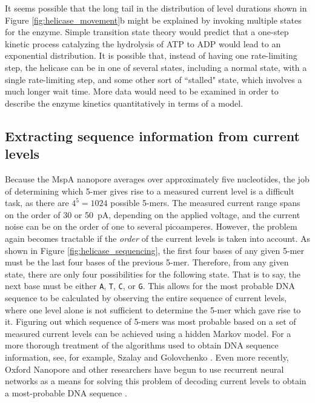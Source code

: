 It seems possible that the long tail in the distribution of level durations shown in Figure \ref{fig:helicase_movement}b might be explained by invoking multiple states for the enzyme.  Simple transition state theory would predict that a one-step kinetic process catalyzing the hydrolysis of ATP to ADP would lead to an exponential distribution.  It is possible that, instead of having one rate-limiting step, the helicase can be in one of several states, including a normal state, with a single rate-limiting step, and some other sort of ``stalled" state, which involves a much longer wait time.  More data would need to be examined in order to describe the enzyme kinetics quantitatively in terms of a model.

\subsection{Extracting sequence information from current levels}

Because the MspA nanopore averages over approximately five nucleotides, the job of determining which 5-mer gives rise to a measured current level is a difficult task, as there are $4^5 = 1024$ possible 5-mers.  The measured current range spans on the order of \num{30} or \SI{50}{\pA}, depending on the applied voltage, and the current noise can be on the order of one to several picoamperes.  However, the problem again becomes tractable if the \textit{order} of the current levels is taken into account.  As shown in Figure \ref{fig:helicase_sequencing}, the first four bases of any given 5-mer must be the last four bases of the previous 5-mer.  Therefore, from any given state, there are only four possibilities for the following state.  That is to say, the next base must be either \texttt{A}, \texttt{T}, \texttt{C}, or \texttt{G}.  This allows for the most probable DNA sequence to be calculated by observing the entire sequence of current levels, where one level alone is not sufficient to determine the 5-mer which gave rise to it.  Figuring out which sequence of 5-mers was most probable based on a set of measured current levels can be achieved using a hidden Markov model.  For a more thorough treatment of the algorithms used to obtain DNA sequence information, see, for example, Szalay and Golovchenko \citep{Szalay2015}.  Even more recently, Oxford Nanopore and other researchers have begun to use recurrent neural networks as a means for solving this problem of decoding current levels to obtain a most-probable DNA sequence \citep{Boza2017}.

